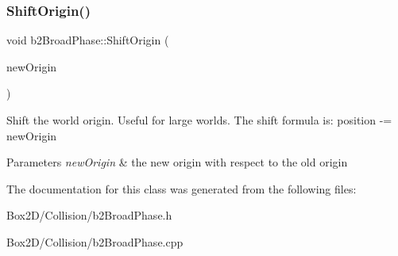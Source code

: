 \subsubsection{\texorpdfstring{Shift\+Origin()}{ShiftOrigin()}}
{\footnotesize\ttfamily void b2\+Broad\+Phase\+::\+Shift\+Origin (\begin{DoxyParamCaption}\item[{const \hyperlink{structb2_vec2}{b2\+Vec2} \&}]{new\+Origin }\end{DoxyParamCaption})\hspace{0.3cm}{\ttfamily [inline]}}

Shift the world origin. Useful for large worlds. The shift formula is\+: position -\/= new\+Origin 
\begin{DoxyParams}{Parameters}
{\em new\+Origin} & the new origin with respect to the old origin \\
\hline
\end{DoxyParams}


The documentation for this class was generated from the following files\+:\begin{DoxyCompactItemize}
\item 
Box2\+D/\+Collision/b2\+Broad\+Phase.\+h\item 
Box2\+D/\+Collision/b2\+Broad\+Phase.\+cpp\end{DoxyCompactItemize}
